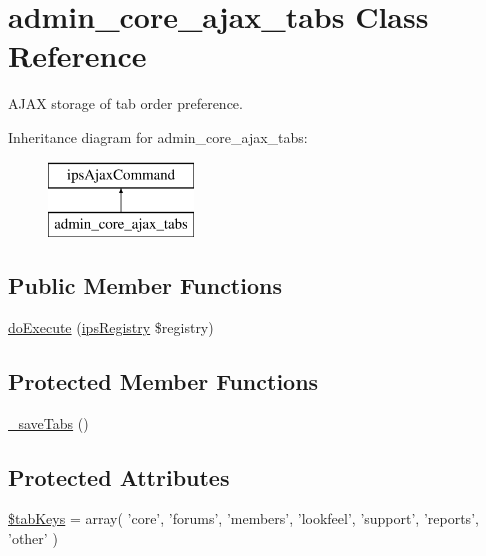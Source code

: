 \hypertarget{classadmin__core__ajax__tabs}{\section{admin\-\_\-core\-\_\-ajax\-\_\-tabs Class Reference}
\label{classadmin__core__ajax__tabs}
}


A\-J\-A\-X storage of tab order preference.  


Inheritance diagram for admin\-\_\-core\-\_\-ajax\-\_\-tabs\-:\begin{figure}[H]
\begin{center}
\leavevmode
\includegraphics[height=2.000000cm]{classadmin__core__ajax__tabs}
\end{center}
\end{figure}
\subsection*{Public Member Functions}
\begin{DoxyCompactItemize}
\item 
\hyperlink{classadmin__core__ajax__tabs_afbc4e912a0604b94d47d66744c64d8ba}{do\-Execute} (\hyperlink{classips_registry}{ips\-Registry} \$registry)
\end{DoxyCompactItemize}
\subsection*{Protected Member Functions}
\begin{DoxyCompactItemize}
\item 
\hyperlink{classadmin__core__ajax__tabs_a3aa0f728081591b55577b439e21cc616}{\-\_\-save\-Tabs} ()
\end{DoxyCompactItemize}
\subsection*{Protected Attributes}
\begin{DoxyCompactItemize}
\item 
\hyperlink{classadmin__core__ajax__tabs_a2f88bfd5e3922bac4cd227cf52415b60}{\$tab\-Keys} = array( 'core', 'forums', 'members', 'lookfeel', 'support', 'reports', 'other' )
\end{DoxyCompactItemize}


